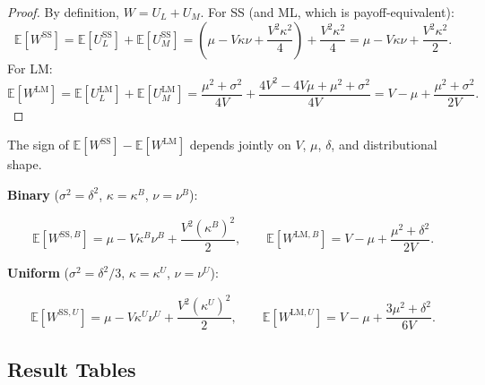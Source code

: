 \documentclass[
  english,
  a4paper,
  12pt]{article}
\newcommand{\E}{\mathbb{E}}
\theoremstyle{plain}
\theoremstyle{plain}
\theoremstyle{definition}
\theoremstyle{remark}
\begin{document}
\begin{proof}
By definition, \(W=U_L+U_M\). For SS (and ML, which is
payoff-equivalent): \[
\E[W^{\mathrm{SS}}]
=\E[U_L^{\mathrm{SS}}]+\E[U_M^{\mathrm{SS}}]
=\left(\mu-V\kappa\nu+\frac{V^2\kappa^2}{4}\right)+\frac{V^2\kappa^2}{4}
=\mu-V\kappa\nu+\frac{V^2\kappa^2}{2}.
\] For LM: \[
\E[W^{\mathrm{LM}}]
=\E[U_L^{\mathrm{LM}}]+\E[U_M^{\mathrm{LM}}]
=\frac{\mu^2+\sigma^2}{4V}+\frac{4V^2-4V\mu+\mu^2+\sigma^2}{4V}
=V-\mu+\frac{\mu^2+\sigma^2}{2V}.
\]
\end{proof}

The sign of \(\E[W^{\mathrm{SS}}]-\E[W^{\mathrm{LM}}]\) depends jointly
on \(V\), \(\mu\), \(\delta\), and distributional shape.

\textbf{Binary} (\(\sigma^2=\delta^2\), \(\kappa=\kappa^B\),
\(\nu=\nu^B\)):

\[
\E[W^{\mathrm{SS},B}] = \mu - V\kappa^B\nu^B + \frac{V^2(\kappa^B)^2}{2},
\qquad
\E[W^{\mathrm{LM},B}] = V - \mu + \frac{\mu^2 + \delta^2}{2V}.
\]

\textbf{Uniform} (\(\sigma^2=\delta^2/3\), \(\kappa=\kappa^U\),
\(\nu=\nu^U\)):

\[
\E[W^{\mathrm{SS},U}] = \mu - V\kappa^U\nu^U + \frac{V^2(\kappa^U)^2}{2},
\qquad
\E[W^{\mathrm{LM},U}] = V - \mu + \frac{3\mu^2 + \delta^2}{6V}.
\]

\subsection{Result Tables}\label{result-tables}
\end{document}
